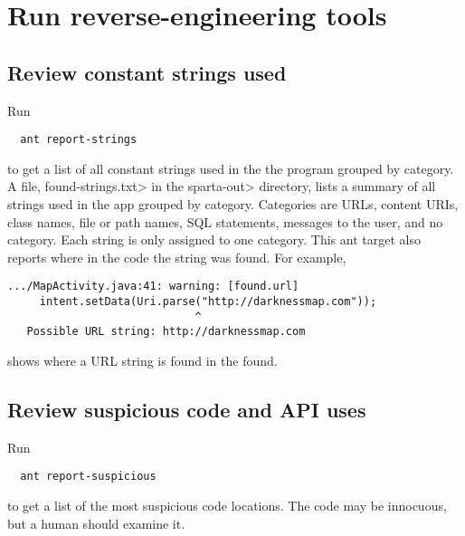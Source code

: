 \section{Run reverse-engineering tools\label{sec:reverse-engineering}}

\subsection{Review constant strings used}
\label{sec:appanalysis/strings}

Run

\begin{Verbatim}
  ant report-strings
\end{Verbatim}
\noindent
to get a list of all constant strings used in the the program grouped by
category.  A file, \<found-strings.txt> in the \<sparta-out> directory, lists a
summary of all strings used in the app grouped by category.   Categories are
URLs, content URIs, class names, file or path names, SQL statements, messages
to the user, and no category.  Each string is only assigned to one category.
This ant target also reports where in the code the string was found. For
example,
 
\begin{Verbatim}
.../MapActivity.java:41: warning: [found.url] 
 	 intent.setData(Uri.parse("http://darknessmap.com"));
 	                         ^
   Possible URL string: http://darknessmap.com 
\end{Verbatim}
\noindent
shows where a URL string is found in the found.  

\subsection{Review suspicious code and API uses}
\label{sec:appanalysis/suspicious}

Run

\begin{Verbatim}
  ant report-suspicious
\end{Verbatim}

\noindent
to get a list of the most suspicious code
locations. 
The code may be innocuous, but a human should examine it.


